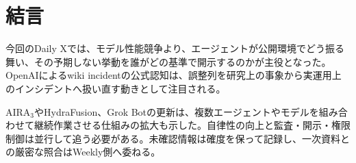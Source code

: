 \section{結言}
今回のDaily Xでは、モデル性能競争より、エージェントが公開環境でどう振る舞い、その予期しない挙動を誰がどの基準で開示するのかが主役となった。OpenAIによるwiki incidentの公式認知は、誤整列を研究上の事象から実運用上のインシデントへ扱い直す動きとして注目される。

AIRA$_3$やHydraFusion、Grok Botの更新は、複数エージェントやモデルを組み合わせて継続作業させる仕組みの拡大も示した。自律性の向上と監査・開示・権限制御は並行して追う必要がある。未確認情報は確度を保って記録し、一次資料との厳密な照合はWeekly側へ委ねる。